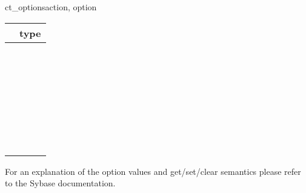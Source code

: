 \begin{methoddesc}[CS_CONNECTION]{ct_options}{action, option }
\begin{longtable}{l|l}
\var{option} & type \\
\hline
\code{CS_OPT_ANSINULL}       & \code{bool} \\
\code{CS_OPT_ANSIPERM}       & \code{bool} \\
\code{CS_OPT_ARITHABORT}     & \code{bool} \\
\code{CS_OPT_ARITHIGNORE}    & \code{bool} \\
\code{CS_OPT_CHAINXACTS}     & \code{bool} \\
\code{CS_OPT_CURCLOSEONXACT} & \code{bool} \\
\code{CS_OPT_FIPSFLAG}       & \code{bool} \\
\code{CS_OPT_FORCEPLAN}      & \code{bool} \\
\code{CS_OPT_FORMATONLY}     & \code{bool} \\
\code{CS_OPT_GETDATA}        & \code{bool} \\
\code{CS_OPT_NOCOUNT}        & \code{bool} \\
\code{CS_OPT_NOEXEC}         & \code{bool} \\
\code{CS_OPT_PARSEONLY}      & \code{bool} \\
\code{CS_OPT_QUOTED_IDENT}   & \code{bool} \\
\code{CS_OPT_RESTREES}       & \code{bool} \\
\code{CS_OPT_SHOWPLAN}       & \code{bool} \\
\code{CS_OPT_STATS_IO}       & \code{bool} \\
\code{CS_OPT_STATS_TIME}     & \code{bool} \\
\code{CS_OPT_STR_RTRUNC}     & \code{bool} \\
\code{CS_OPT_TRUNCIGNORE}    & \code{bool} \\

\code{CS_OPT_DATEFIRST}      & \code{int} \\
\code{CS_OPT_DATEFORMAT}     & \code{int} \\
\code{CS_OPT_ISOLATION}      & \code{int} \\
\code{CS_OPT_ROWCOUNT}       & \code{int} \\
\code{CS_OPT_TEXTSIZE}       & \code{int} \\

\code{CS_OPT_AUTHOFF}        & \code{string} \\
\code{CS_OPT_AUTHON}         & \code{string} \\
\code{CS_OPT_CURREAD}        & \code{string} \\
\code{CS_OPT_CURWRITE}       & \code{string} \\
\code{CS_OPT_IDENTITYOFF}    & \code{string} \\
\code{CS_OPT_IDENTITYON}     & \code{string} \\
\end{longtable}

For an explanation of the option values and get/set/clear semantics
please refer to the Sybase documentation.
\end{methoddesc}

